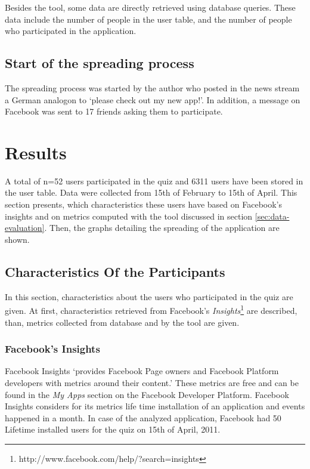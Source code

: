 \documentclass[preprint,12pt]{elsarticle}
\begin{document}
Besides the tool, some data are directly retrieved using database
queries. These data include the number of people in the user table, and
the number of people who participated in the application.



\subsection{Start of the spreading process}
\label{sec:start-spre-proc}
The spreading process was started by the author who posted in the news
stream a German analogon to `please check out my new app!'. In
addition, a message on Facebook was sent to 17 friends asking them to
participate. 


\section{Results}
\label{sec:results}
A total of n=52 users participated in the quiz and 6311 users have been
stored in the user table. Data were collected from 15th of February to
15th of April. This section presents, which
characteristics these users have based on Facebook's insights and on
metrics computed with the tool discussed in section
\ref{sec:data-evaluation}. Then, the graphs detailing the spreading of
the application are shown.

\subsection{Characteristics Of the Participants}
\label{sec:characteristics}
In this section, characteristics about the users who participated in
the quiz are given. At first, characteristics retrieved from
Facebook's
\textit{Insights}\footnote{http://www.facebook.com/help/?search=insights}
are described, than, metrics collected from database and by the tool are given.

\subsubsection{Facebook's Insights}
Facebook Insights `provides Facebook Page owners and Facebook Platform
developers with metrics around their content.'\cite{facebookInsights}
These metrics are free and can be found in the \textit{My Apps}
section on the Facebook Developer Platform.
Facebook Insights considers for its metrics life time installation of an application
and events happened in a month. In case of the analyzed application,
Facebook had 50 Lifetime installed users for the quiz on 15th of April, 2011.
\end{document}
